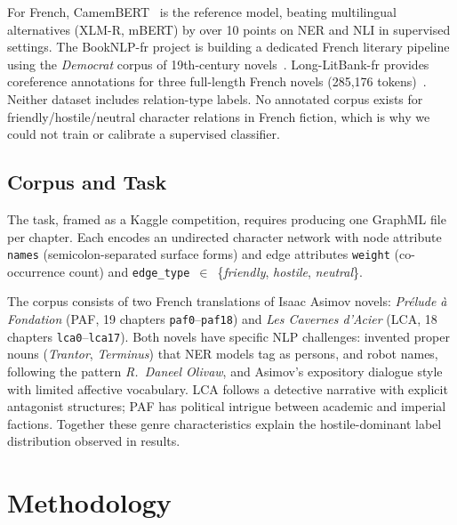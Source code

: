 \documentclass[a4paper]{article}
\begin{document}
For French, CamemBERT~\cite{Martin2020} is the reference model, beating
multilingual alternatives (XLM-R, mBERT) by over 10 points on NER and NLI
in supervised settings. The BookNLP-fr project is building a dedicated
French literary pipeline using the \textit{Democrat} corpus of 19th-century
novels~\cite{Bechet2024}. Long-LitBank-fr provides coreference annotations
for three full-length French novels (285,176 tokens)~\cite{LongLitBankFr2025}.
Neither dataset includes relation-type labels. No annotated corpus exists
for friendly/hostile/neutral character relations in French fiction, which
is why we could not train or calibrate a supervised classifier.


\subsection{Corpus and Task}

The task, framed as a Kaggle competition, requires producing one GraphML
file per chapter. Each encodes an undirected character network with node
attribute \texttt{names} (semicolon-separated surface forms) and edge
attributes \texttt{weight} (co-occurrence count) and
\texttt{edge\_type}~$\in$~\{\textit{friendly}, \textit{hostile},
\textit{neutral}\}.

The corpus consists of two French translations of Isaac Asimov novels:
\textit{Prélude à Fondation} (PAF, 19 chapters \texttt{paf0}--\texttt{paf18})
and \textit{Les Cavernes d'Acier} (LCA, 18 chapters \texttt{lca0}--\texttt{lca17}).
Both novels have specific NLP challenges: invented proper nouns
(\textit{Trantor}, \textit{Terminus}) that NER models tag as persons,
and robot names, following the pattern \textit{R.~Daneel Olivaw}, and Asimov's
expository dialogue style with limited affective vocabulary.
LCA follows a detective narrative with explicit antagonist structures;
PAF has political intrigue between academic and imperial factions.
Together these genre characteristics explain the hostile-dominant label
distribution observed in results.

\section{Methodology}
\end{document}
